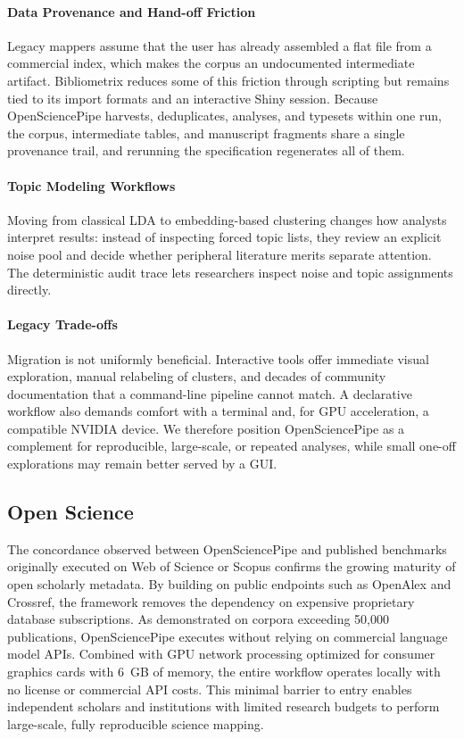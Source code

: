 \documentclass[preprint,12pt]{elsarticle}
\begin{document}
\paragraph{Data Provenance and Hand-off Friction}
Legacy mappers assume that the user has already assembled a flat file from a commercial index, which makes the corpus an undocumented intermediate artifact. Bibliometrix reduces some of this friction through scripting but remains tied to its import formats and an interactive Shiny session. Because OpenSciencePipe harvests, deduplicates, analyses, and typesets within one run, the corpus, intermediate tables, and manuscript fragments share a single provenance trail, and rerunning the specification regenerates all of them.

\paragraph{Topic Modeling Workflows}
Moving from classical LDA to embedding-based clustering changes how analysts interpret results: instead of inspecting forced topic lists, they review an explicit noise pool and decide whether peripheral literature merits separate attention. The deterministic audit trace lets researchers inspect noise and topic assignments directly.

\paragraph{Legacy Trade-offs}
Migration is not uniformly beneficial. Interactive tools offer immediate visual exploration, manual relabeling of clusters, and decades of community documentation that a command-line pipeline cannot match. A declarative workflow also demands comfort with a terminal and, for GPU acceleration, a compatible NVIDIA device. We therefore position OpenSciencePipe as a complement for reproducible, large-scale, or repeated analyses, while small one-off explorations may remain better served by a GUI.

\subsection{Open Science}
The concordance observed between OpenSciencePipe and published benchmarks originally executed on Web of Science or Scopus confirms the growing maturity of open scholarly metadata. By building on public endpoints such as OpenAlex and Crossref, the framework removes the dependency on expensive proprietary database subscriptions.
As demonstrated on corpora exceeding 50,000 publications, OpenSciencePipe executes without relying on commercial language model APIs. Combined with GPU network processing optimized for consumer graphics cards with 6~GB of memory, the entire workflow operates locally with no license or commercial API costs. This minimal barrier to entry enables independent scholars and institutions with limited research budgets to perform large-scale, fully reproducible science mapping.
\end{document}
